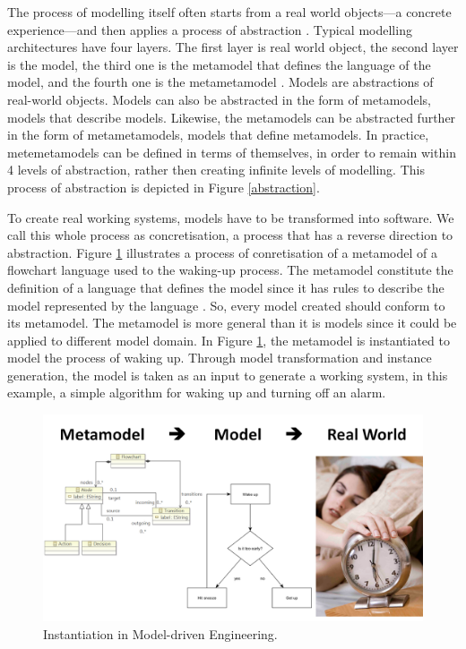 \documentclass[12pt, a4paper]{report}
\begin{document}
{The process of modelling itself often starts from a real world objects---a concrete experience---and then applies a process of abstraction \cite{white2010teaching, engels2005teaching}. Typical modelling architectures have four layers. The first layer is real world object, the second layer is the model, the third one is the metamodel that defines the language of the model, and the fourth one is the metametamodel \cite{brambilla2012model}. Models are abstractions of real-world objects. Models can also be abstracted in the form of metamodels, models that describe models. Likewise, the metamodels can be abstracted further in the form of metametamodels, models that define metamodels. In practice, metemetamodels can be defined in terms of themselves, in order to remain within 4 levels of abstraction, rather then creating infinite levels of modelling. This process of abstraction is depicted in Figure \ref{abstraction}.
 
To create real working systems, models have to be transformed into software. We call this whole process as concretisation, a process that has a reverse direction to abstraction. Figure \ref{concretisation} illustrates a process of conretisation of a metamodel of a flowchart language used to the waking-up process. The metamodel constitute the definition of a language that defines the model since it has rules to describe the model represented by the language \cite{brambilla2012model}. So, every model created should conform to its metamodel. The metamodel is more general than it is models since it could be applied to different model domain. In Figure \ref{concretisation}, the metamodel is instantiated to model the process of waking up. Through model transformation and instance generation, the model is taken as an input to generate a working system, in this example, a simple algorithm for waking up and turning off an alarm.   

\begin{figure}[!t]
\centering
\includegraphics[width=13cm]{concretisation}
\caption{Instantiation in Model-driven Engineering.}
\label{concretisation}
\end{figure}
   
}
\end{document}
